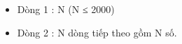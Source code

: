 \begin{itemize}
	\item Dòng 1 : N (N ≤ 2000)
	\item Dòng 2 : N dòng tiếp theo gồm N số.
\end{itemize}